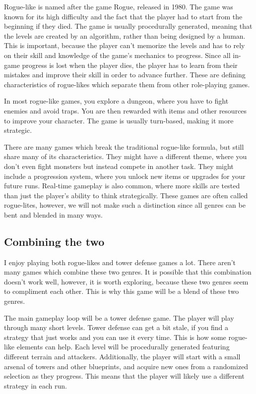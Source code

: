 Rogue-like is named after the game Rogue, released in 1980. The game was known for its high difficulty and the fact that the player had to start from the beginning if they died. The game is usually procedurally generated, meaning that the levels are created by an algorithm, rather than being designed by a human. This is important, because the player can't memorize the levels and has to rely on their skill and knowledge of the game's mechanics to progress. Since all in-game progress is lost when the player dies, the player has to learn from their mistakes and improve their skill in order to advance further. These are defining characteristics of rogue-likes which separate them from other role-playing games.

In most rogue-like games, you explore a dungeon, where you have to fight enemies and avoid traps. You are then rewarded with items and other resources to improve your character. The game is usually turn-based, making it more strategic.

There are many games which break the traditional rogue-like formula, but still share many of its characteristics. They might have a different theme, where you don't even fight monsters but instead compete in another task. They might include a progression system, where you unlock new items or upgrades for your future runs. Real-time gameplay is also common, where more skills are tested than just the player's ability to think strategically. These games are often called rogue-lites, however, we will not make such a distinction since all genres can be bent and blended in many ways. 

\subsection{Combining the two}

I enjoy playing both rogue-likes and tower defense games a lot. There aren't many games which combine these two genres. It is possible that this combination doesn't work well, however, it is worth exploring, because these two genres seem to compliment each other. This is why this game will be a blend of these two genres.

The main gameplay loop will be a tower defense game. The player will play through many short levels. Tower defense can get a bit stale, if you find a strategy that just works and you can use it every time. This is how some rogue-like elements can help. Each level will be procedurally generated featuring different terrain and attackers. Additionally, the player will start with a small arsenal of towers and other blueprints, and acquire new ones from a randomized selection as they progress. This means that the player will likely use a different strategy in each run.

